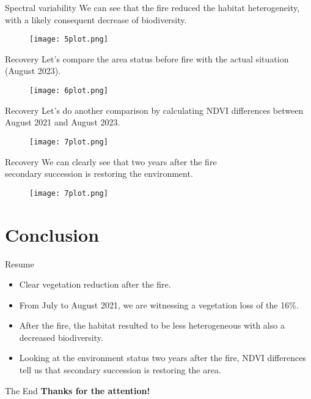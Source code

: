 \documentclass{beamer} %
\begin{document}
\begin{frame}{Spectral variability}
\centering
We can see that the fire reduced the habitat heterogeneity,\\ with a likely consequent decrease of biodiversity.  
\begin{figure}
    \centering
    \texttt{[image: 5plot.png]}
\end{figure}
\end{frame}

\begin{frame}{Recovery}
\centering
Let's compare the area status before fire with the actual situation (August 2023). 
\begin{figure}
       \centering
       \texttt{[image: 6plot.png]}
   \end{figure}   
\end{frame}

\begin{frame}{Recovery}
\centering
Let's do another comparison by calculating NDVI differences between August 2021 and August 2023.
\begin{figure}
     \centering
     \texttt{[image: 7plot.png]}
 \end{figure} 
\end{frame}

\begin{frame}{Recovery}
\centering
We can clearly see that two years after the fire\\ secondary succession is restoring the environment.
\begin{figure}
     \centering
     \texttt{[image: 7plot.png]}
 \end{figure} 
\end{frame}


\section{Conclusion} %

\begin{frame}{Resume}
\begin{itemize}
    \item Clear vegetation reduction after the fire.
    \bigskip
    \pause \item From July to August 2021, we are witnessing a vegetation loss of the 16\%. 
    \bigskip
    \pause \item After the fire, the habitat resulted to be less heterogeneous with also a decreased biodiversity. 
    \bigskip
    \pause \item Looking at the environment status two years after the fire, NDVI differences tell us that secondary succession is restoring the area.
\end{itemize}
\end{frame}

\begin{frame}{The End}
\centering
\large \textbf{Thanks for the attention!}
\end{frame}
\end{document}
